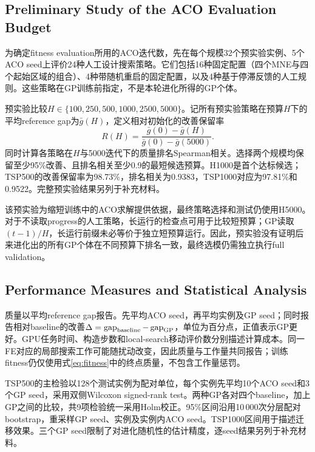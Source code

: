 \subsection{Preliminary Study of the ACO Evaluation Budget}
\label{sec:budget-study}
为确定fitness evaluation所用的ACO迭代数，先在每个规模32个预实验实例、5个ACO seed上评价24种人工设计搜索策略。它们包括16种固定配置（四个MNE与四个起始区域的组合）、4种带随机重启的固定配置，以及4种基于停滞反馈的人工规则。这些策略在GP训练前指定，不是本轮进化所得的GP个体。

预实验比较$H\in\{100,250,500,1000,2500,5000\}$。记所有预实验策略在预算$H$下的平均reference gap为$\bar g(H)$，定义相对初始化的改善保留率
\begin{equation}
 R(H)=\frac{\bar g(0)-\bar g(H)}{\bar g(0)-\bar g(5000)}.
\end{equation}
同时计算各策略在$H$与5000迭代下的质量排名Spearman相关。选择两个规模均保留至少95\%改善、且排名相关至少0.9的最短候选预算。H1000是首个达标候选；TSP500的改善保留率为98.73\%，排名相关为0.9383，TSP1000对应为97.81\%和0.9522。完整预实验结果另列于补充材料。

该预实验为缩短训练中的ACO求解提供依据，最终策略选择和测试仍使用H5000。对于不读取progress的人工策略，长运行的检查点可用于比较短预算；GP读取$(t-1)/H$，长运行前缀未必等价于独立短预算运行。因此，预实验没有证明后来进化出的所有GP个体在不同预算下排名一致，最终选模仍需独立执行full validation。

\subsection{Performance Measures and Statistical Analysis}
质量以平均reference gap报告。先平均ACO seed，再平均实例及GP seed；同时报告相对baseline的改善$\Delta=\operatorname{gap}_{\rm baseline}-\operatorname{gap}_{\rm GP}$，单位为百分点，正值表示GP更好。GPU任务时间、构造步数和local-search移动评价数分别描述计算成本。同一FE对应的局部搜索工作可能随扰动改变，因此质量与工作量共同报告；训练fitness仍仅使用式\eqref{eq:fitness}中的终点质量，不包含工作量惩罚。

TSP500的主检验以128个测试实例为配对单位，每个实例先平均10个ACO seed和3个GP seed，采用双侧Wilcoxon signed-rank test\cite{wilcoxon1945}。两种GP各对四个baseline，加上GP之间的比较，共9项检验统一采用Holm校正\cite{holm1979}。95\%区间沿用10\,000次分层配对bootstrap，重采样GP seed、实例及实例内ACO seed。TSP1000区间用于描述迁移效果。三个GP seed限制了对进化随机性的估计精度，逐seed结果另列于补充材料。
